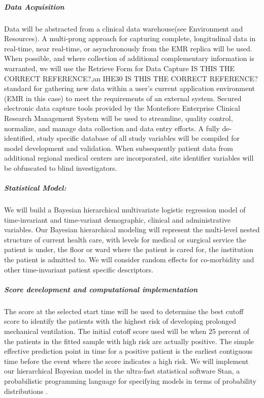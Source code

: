 \documentclass[11pt,notitlepage]{article}
\begin{document}
\subparagraph*{Data Acquisition}
Data will be abstracted from a clinical data warehouse(see Environment and Resources). A multi-prong approach for capturing complete, longitudinal data in real-time, near real-time, or asynchronously from the EMR replica will be used. When possible, and where collection of additional complementary information is warranted, we will use the Retrieve Form for Data Capture IS THIS THE CORRECT REFERENCE?\cite{Rothenhaeusler_2005},an IHE30 IS THIS THE CORRECT REFERENCE? \cite{Rotte_15809512} standard for gathering new data within a user's current application environment (EMR in this case) to meet the requirements of an external system. Secured electronic data capture tools provided by the Montefiore Enterprise Clinical Research Management System will be used to streamline, quality control, normalize, and manage data collection and data entry efforts. A fully de-identified, study specific database of all study variables will be compiled for model development and validation. When subsequently patient data from additional regional medical centers are incorporated, site identifier variables will be obfuscated to blind investigators.

\subparagraph*{Statistical Model:}
We will build a Bayesian hierarchical multivariate logistic regression model of time-invariant and time-variant demographic, clinical  and administrative variables. Our Bayesian hierarchical modeling will represent the multi-level nested structure of current health care, with levels for medical or surgical service the patient is under, the floor or ward where the patient is cared for, the institution the patient is admitted to. We will consider random effects for co-morbidity and other time-invariant patient specific descriptors. 

\subparagraph*{Score development and computational implementation}
The score at the selected start time will be used to determine the best cutoff score to identify the patients with the highest risk of developing prolonged mechanical ventilation. The initial cutoff score used will be when 25 percent of the patients in the fitted sample with high risk are actually positive. The simple effective prediction point in time for a positive patient is the earliest contiguous time before the event where the score indicates a high risk. We will implement our hierarchical Bayesian model in the ultra-fast statistical software Stan, a probabilistic programming language for specifying models in terms of probability distributions \cite{Stan_Software_2014}. 
\end{document}
